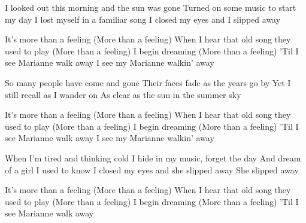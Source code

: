 I looked out this morning and the sun was gone 
Turned on some music to start my day 
I lost myself in a familiar song 
I closed my eyes and I slipped away 

It's more than a feeling 
(More than a feeling) 
When I hear that old song they used to play 
(More than a feeling) 
I begin dreaming 
(More than a feeling) 
'Til I see Marianne walk away 
I see my Marianne walkin' away 

So many people have come and gone 
Their faces fade as the years go by 
Yet I still recall as I wander on 
As clear as the sun in the summer sky 

It's more than a feeling 
(More than a feeling) 
When I hear that old song they used to play 
(More than a feeling) 
I begin dreaming 
(More than a feeling) 
'Til I see Marianne walk away 
I see my Marianne walkin' away 

When I'm tired and thinking cold 
I hide in my music, forget the day 
And dream of a girl I used to know 
I closed my eyes and she slipped away 
She slipped away 

It's more than a feeling 
(More than a feeling) 
When I hear that old song they used to play 
(More than a feeling) 
I begin dreaming 
(More than a feeling) 
'Til I see Marianne walk away
